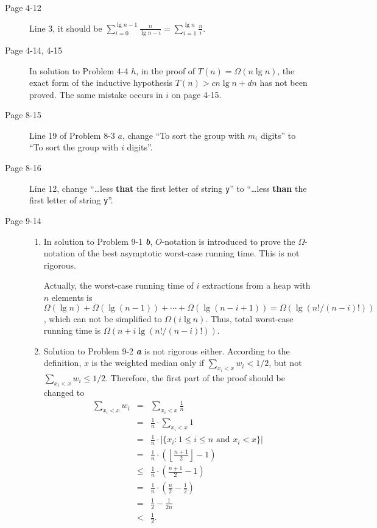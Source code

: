 \documentclass[a4paper, fleqn]{article}
\begin{document}
\begin{description}

\item[Page 4-12]
Line 3, it should be $\sum_{i = 0}^{\lg n - 1} \frac{n}{\lg n - i} =
\sum_{i = 1}^{\lg n} \frac{n}{i}$.




\item[Page 4-14, 4-15]
In solution to Problem 4-4 $h$, in the proof of $T(n) = \Omega(n
\lg n)$, the exact form of the inductive hypothesis $T(n) > cn \lg n +
dn$ has not been proved. The same mistake occurs in $i$ on page 4-15.




\item[Page 8-15]
Line 19 of Problem 8-3 $a$, change ``To sort the group with $m_i$
digits'' to ``To sort the group with $i$ digits''.




\item[Page 8-16]
Line 12, change ``\ldots less \textbf{that} the first letter of string
\texttt{y}'' to ``\ldots less \textbf{than} the first letter of string
\texttt{y}''.




\item[Page 9-14]
\begin{enumerate}
\item
In solution to Problem 9-1 \textbf{\textit{b}}, $O$-notation is
introduced to prove the $\Omega$-notation of the best asymptotic
worst-case running time. This is not rigorous.

Actually, the worst-case running time of $i$ extractions from a heap
with $n$ elements is $\Omega(\lg n) + \Omega(\lg(n-1)) + \cdots +
\Omega(\lg(n-i+1)) = \Omega(\lg(n! / (n-i)!))$, which can not be
simplified to $\Omega(i \lg n)$. Thus, total worst-case running time
is $\Omega(n + i \lg(n! / (n-i)!))$.

\item
Solution to Problem 9-2 \textbf{\textit{a}} is not rigorous
either. According to the definition, $x$ is the weighted median only
if $\sum_{x_i < x} w_i < 1/2$, but not $\sum_{x_i < x} w_i \leq
1/2$. Therefore, the first part of the proof should be changed to
\begin{eqnarray*}
\sum_{x_i < x} w_i
& = & \sum_{x_i < x} \frac{1}{n} \\
& = & \frac{1}{n} \cdot \sum_{x_i < x} 1 \\
& = & \frac{1}{n} \cdot |\{x_i : 1 \leq i \leq n \mbox{ and } x_i < x\}| \\
& = & \frac{1}{n} \cdot \left(\left\lfloor\frac{n+1}{2}\right\rfloor -
1\right) \\
& \leq & \frac{1}{n} \cdot \left(\frac{n+1}{2} - 1\right) \\
& = & \frac{1}{n} \cdot \left(\frac{n}{2} - \frac{1}{2}\right) \\
& = & \frac{1}{2} - \frac{1}{2n} \\
& < & \frac{1}{2}.
\end{eqnarray*}
\end{enumerate}





\end{description}
\end{document}
